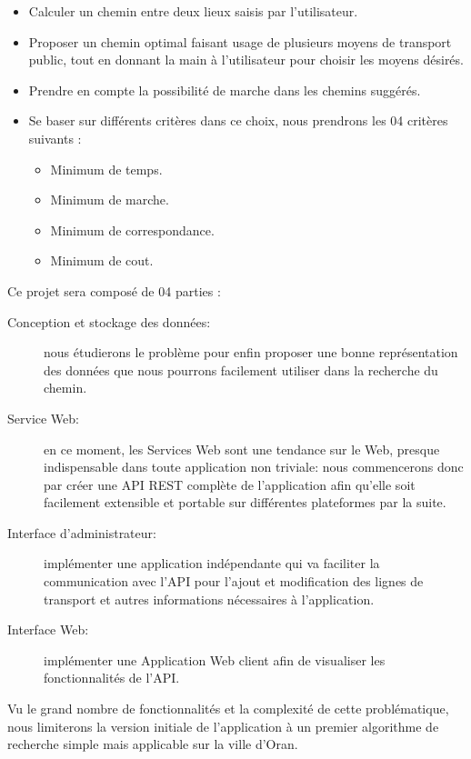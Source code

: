 \begin{itemize}
	\item Calculer un chemin entre deux lieux saisis par l'utilisateur.
	\item Proposer un chemin optimal faisant usage de plusieurs moyens de transport public, tout en donnant la main à l'utilisateur pour choisir les moyens désirés.
	\item Prendre en compte la possibilité de marche dans les chemins suggérés.
	\item Se baser sur différents critères dans ce choix, nous prendrons les 04 critères suivants : 
	\begin{itemize}
		\item Minimum de temps.
		\item Minimum de marche.
		\item Minimum de correspondance.
		\item Minimum de cout.\newline
	\end{itemize}	 
\end{itemize}
Ce projet sera composé de 04 parties :\newline
\begin{description}
	\item[Conception et stockage des données: ] nous étudierons le problème pour enfin proposer une bonne représentation des données que nous pourrons facilement utiliser dans la recherche du chemin.

	\item[Service Web: ] en ce moment, les Services Web sont une tendance sur le Web, presque indispensable dans toute application non triviale: nous commencerons donc par créer une API REST complète de l'application afin qu'elle soit facilement extensible et portable sur différentes plateformes par la suite.
	
	\item[Interface d'administrateur: ] implémenter une application indépendante qui va faciliter la  communication avec l'API pour l'ajout et modification des lignes de transport et autres informations nécessaires à l'application.
	
	
	\item[Interface Web: ] implémenter une Application Web client afin de visualiser les fonctionnalités de l'API.
\end{description}

Vu le grand nombre de fonctionnalités et la complexité de cette problématique, nous limiterons la version initiale de l'application à un premier algorithme de recherche simple mais applicable sur la ville d'Oran.

